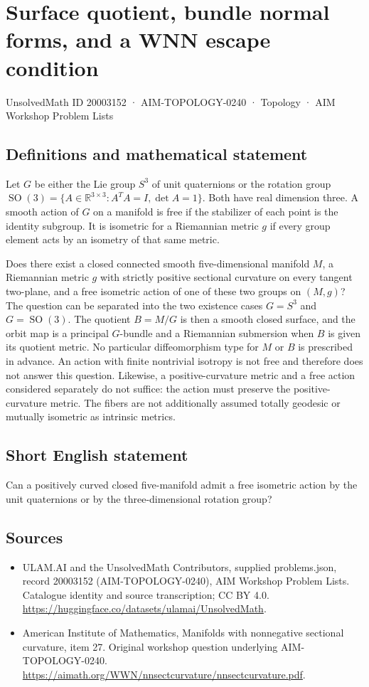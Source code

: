 \documentclass[11pt,a4paper]{article}
\begin{document}
\section*{Surface quotient, bundle normal forms, and a WNN escape condition}\label{20003152}
{\small UnsolvedMath ID 20003152 · AIM-TOPOLOGY-0240 · Topology · AIM Workshop Problem Lists}
\subsection{Definitions and mathematical statement}
Let $G$ be either the Lie group $S^3$ of unit quaternions or the rotation group
$\operatorname{SO}(3)=\{A\in\mathbb R^{3\times3}:A^TA=I,\det A=1\}$.
Both have real dimension three.
A smooth action of $G$ on a manifold is free if the stabilizer of each point is the identity subgroup.
It is isometric for a Riemannian metric $g$ if every group element acts by an isometry of that same metric.

Does there exist a closed connected smooth five-dimensional manifold $M$, a Riemannian metric $g$ with strictly positive sectional curvature on every tangent two-plane, and a free isometric action of one of these two groups on $(M,g)$?
The question can be separated into the two existence cases $G=S^3$ and $G=\operatorname{SO}(3)$.
The quotient $B=M/G$ is then a smooth closed surface, and the orbit map is a principal $G$-bundle and a Riemannian submersion when $B$ is given its quotient metric.
No particular diffeomorphism type for $M$ or $B$ is prescribed in advance.
An action with finite nontrivial isotropy is not free and therefore does not answer this question.
Likewise, a positive-curvature metric and a free action considered separately do not suffice: the action must preserve the positive-curvature metric.
The fibers are not additionally assumed totally geodesic or mutually isometric as intrinsic metrics.
\subsection{Short English statement}
Can a positively curved closed five-manifold admit a free isometric action by the unit quaternions or by the three-dimensional rotation group?
\subsection{Sources}
\begin{itemize}
\item[S1] ULAM.AI and the UnsolvedMath Contributors, supplied problems.json, record 20003152 (AIM-TOPOLOGY-0240), AIM Workshop Problem Lists. Catalogue identity and source transcription; CC BY 4.0.
\url{https://huggingface.co/datasets/ulamai/UnsolvedMath}.
\item[S2] American Institute of Mathematics, Manifolds with nonnegative sectional curvature, item 27. Original workshop question underlying AIM-TOPOLOGY-0240.
\url{https://aimath.org/WWN/nnsectcurvature/nnsectcurvature.pdf}.
\end{itemize}
\end{document}
